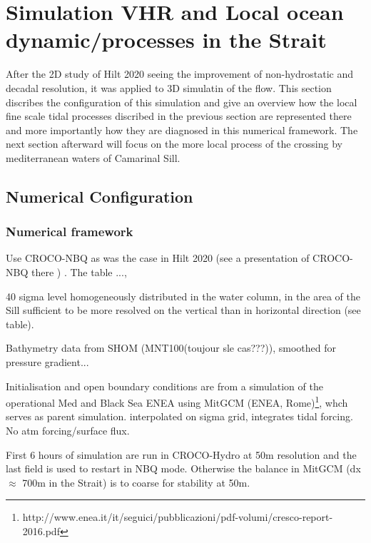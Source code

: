 \section{Simulation VHR and Local ocean dynamic/processes in the Strait}

After the 2D study of Hilt 2020 seeing the improvement of non-hydrostatic and decadal resolution, it was applied to 3D simulatin of the flow. This section discribes the configuration of this simulation and give an overview how the local fine scale tidal processes discribed in the previous section are represented there and more importantly how they are diagnosed in this numerical framework. The next section afterward will focus on the more local process of the crossing by mediterranean waters of Camarinal Sill.



\subsection{Numerical Configuration}
\subsubsection{Numerical framework}

Use CROCO-NBQ as was the case in Hilt 2020 (see a presentation of CROCO-NBQ there ) . The table ..., 

40 sigma level homogeneously distributed in the water column, in the area of the Sill sufficient to be more resolved on the vertical than in horizontal direction (see table).


Bathymetry data from SHOM (MNT100(toujour sle cas???)), smoothed for pressure gradient...

Initialisation and open boundary conditions are from a simulation of the operational Med and Black Sea ENEA using MitGCM (ENEA, Rome)\footnote{http://www.enea.it/it/seguici/pubblicazioni/pdf-volumi/cresco-report-2016.pdf}, whch serves as parent simulation. interpolated on sigma grid, integrates tidal forcing. No atm forcing/surface flux. 

First 6 hours of simulation are run in CROCO-Hydro at 50m resolution and the last field is used to restart in NBQ mode. Otherwise the balance in MitGCM (dx $\approx$ 700m in the Strait) is to coarse for stability at 50m.


